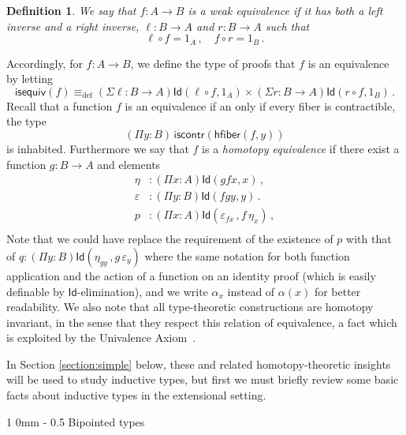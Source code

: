 \documentclass[reqno,10pt,a4paper,oneside]{amsart}
\makeatletter
\numberwithin{equation}{section}
\renewcommand{\section}{\@startsection
  {section}%
   {1}%
  {0mm}%
   {-\baselineskip}%
  {0.5\baselineskip}%
   {\Large\bfseries}}%
\theoremstyle{mythm}
\theoremstyle{mydef}
\newtheorem{definition}[theorem]{Definition}
\theoremstyle{myrmk}
\newcommand{\ie}{\text{i.e.\ }}
\newcommand{\deq}{\equiv}
\newcommand{\defeq}{\deq_{\mathrm{def}}}
\newcommand{\co}{\colon}
\newcommand{\iscontr}{\mathsf{iscontr}}
\newcommand{\isequiv}{\mathsf{isequiv}}
\newcommand{\hfiber}{\mathsf{hfiber}}
\newcommand{\Id}{\mathsf{Id}}
\makeatother
\begin{document}
\begin{definition} \label{thm:weq}  We say that $f : A \rightarrow B$ is a weak equivalence if it has both a left inverse and a right inverse, \ie
$\ell \co B \to A$ and $r \co B \to A$ such that 
\[
 \ell \circ f = 1_A \, ,  \quad  f \circ r = 1_B  \, .
 \]
 \end{definition}
 
 Accordingly, for $f : A \rightarrow B$, we define the type of proofs that $f$ is an equivalence by letting
 \[ 
 \isequiv(f) \defeq (\Sigma \ell \co B \to A) \Id( \ell \circ f, 1_A) \times (\Sigma r \co B \to A) \Id( r \circ f , 1_B) \, .
 \]
Recall that a function $f$ is an equivalence if an only if every fiber is contractible, \ie the type
\[
 (\Pi y : B) \,  \iscontr(\hfiber(f,y)) 
\]
is inhabited. Furthermore we say that $f$ is a \emph{homotopy equivalence} if there exist a function 
$g : B\rightarrow A$ and elements
\begin{align*}
\eta &: (\Pi x : A) \Id( g  f  x , x) \,  ,\\
\varepsilon &: (\Pi y:B) \Id( f   g  y, y) \, . \\
p & : (\Pi x : A) \Id ( \varepsilon_{f x} \, , f \, \eta_x )  \, , \\
\end{align*}
Note that we could have replace the requirement of the existence of $p$ with that of $q \co (\Pi y : B) \Id ( \eta_{g y} \, , g \, \varepsilon_y)$
where the same notation for both function application and
the action of a function on an identity proof (which is easily definable by $\Id$-elimination),
and we write $\alpha_x$ instead of $\alpha(x)$ for better readability.
We also note that all type-theoretic constructions are homotopy invariant, in the sense that they respect this relation of equivalence, a fact which is exploited by the Univalence Axiom~\cite{VoevodskyV:notts}.


\medskip

In Section \ref{section:simple} below, these and related homotopy-theoretic insights will be used to study inductive types, but first we must briefly review some basic facts about  inductive types in the extensional setting.

\newpage

\section{Bipointed types}
\label{section:simple}
\end{document}
